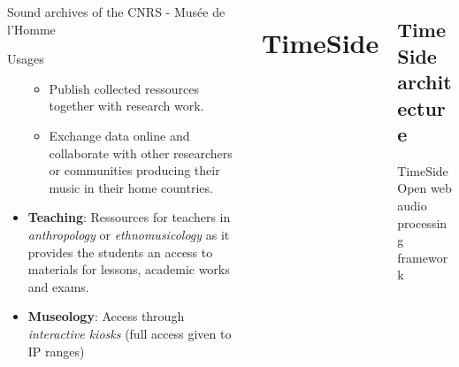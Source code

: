 \documentclass[final, hyperref, table]{beamer}
\begin{document}
\begin{frame}[containsverbatim]{}
\begin{columns}[T]
\begin{column}[T]{.5\linewidth}
\begin{block}{Sound archives of the CNRS - Musée de l'Homme}
\begin{beamerboxesrounded}[shadow=true, width=0.98\linewidth]{Usages}
\begin{itemize}
\begin{itemize}
                \item \alert{Publish} collected ressources together with research
                  work.
                \item \alert{Exchange} data online and \alert{collaborate} with other researchers or
                  communities producing their music in their home countries.
                \end{itemize}
              \item \textbf{Teaching}: Ressources for teachers in \emph{anthropology} or
                \emph{ethnomusicology} as it provides the students an access to
                materials for lessons, academic works and exams.
              \item \textbf{Museology}: Access through \emph{interactive kiosks} (full access given to IP ranges)
              \end{itemize}
       
            \end{beamerboxesrounded}

            \begin{center}
            \end{center}


      \end{block}
      
      
    \end{column}
\section{TimeSide}
\begin{column}[T]{.5\linewidth}
\subsection{TimeSide architecture}
  \begin{block}{{\Large TimeSide}\\Open web audio processing framework}



\end{block}
\end{column}
\end{columns}
\end{frame}
\end{document}

